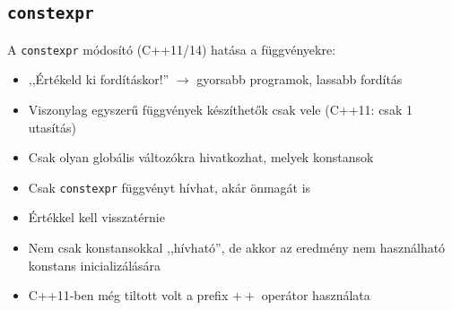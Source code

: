 \documentclass[usenames,dvipsnames,aspectratio=169]{beamer}
\begin{document}
\begin{frame}
    \begin{exampleblock}{}
        
    \end{exampleblock}
    \begin{exampleblock}{}
        
    \end{exampleblock}
\end{frame}

\subsection{\texttt{constexpr}}

\begin{frame}
    A \texttt{constexpr} módosító (C++11/14) hatása a függvényekre:
    \begin{itemize}
        \item ,,Értékeld ki fordításkor!'' $\to$ gyorsabb programok, lassabb fordítás
        \item Viszonylag egyszerű függvények készíthetők csak vele (C++11: csak 1 utasítás)
        \item Csak olyan globális változókra hivatkozhat, melyek konstansok
        \item Csak \texttt{constexpr} függvényt hívhat, akár önmagát is
        \item Értékkel kell visszatérnie
        \item Nem csak konstansokkal ,,hívható'', de akkor az eredmény nem használható konstans inicializálására
        \item C++11-ben még tiltott volt a prefix $++$ operátor használata
    \end{itemize}
\end{frame}

\begin{frame}
    \begin{exampleblock}{}
        \scriptsize
        
    \end{exampleblock}
\end{frame}
\end{document}
